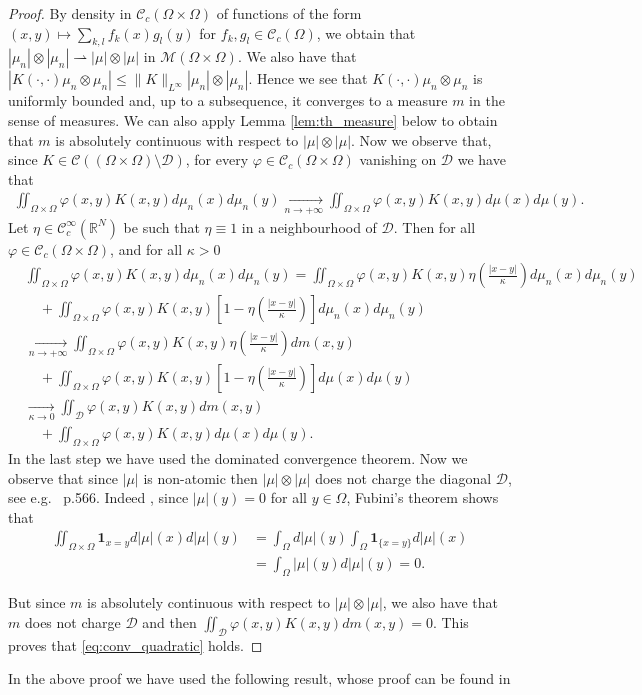 \documentclass[12pt,reqno]{amsart}
\def\C{{\mathcal C}}
\def\D{{\mathcal D}}
\def \O{{\Omega}}
\def\M{{\mathcal M}}
\newcommand{\R}{\mathbb{R}}
\numberwithin{equation}{section}
\begin{document}
\begin{proof}
By density  in \(\C_c(\Omega\times \Omega)\) of functions of the form \((x,y)\mapsto \sum_{k,l} f_k(x)g_l(y)\) for \(f_k,g_l\in \C_c(\Omega)\), we obtain that \(|\mu_n| \otimes |\mu_n| \rightharpoonup |\mu| \otimes |\mu|\) in \(\M(\Omega\times \Omega)\).  We also have that 
\( \left| K(\cdot,\cdot)\mu_n\otimes \mu_n\right| \leq \|K\|_{L^\infty}|\mu_n| \otimes |\mu_n|\). Hence we see that \(K(\cdot,\cdot)\mu_n\otimes \mu_n\) is uniformly bounded and, up to a subsequence, it converges to a measure \(m\) in the sense of measures. We can also apply Lemma \ref{lem:th_measure} below to obtain that \(m\) is absolutely continuous with respect to \(|\mu|\otimes |\mu|\).
Now we observe that, since \(K \in \C((\Omega \times \Omega) \setminus \D)\), for every \(\varphi\in \C_c(\Omega \times \Omega)\) vanishing on \(\D\) we have that
\begin{align*}
\iint_{\O\times \O}\varphi(x,y) K(x,y)d\mu_n(x)d\mu_n(y) \xrightarrow[n \to +\infty]{} \iint_{\O\times \O}\varphi(x,y) K(x,y)d\mu(x)d\mu(y).
\end{align*}
Let \(\eta \in \C^\infty_c(\R^N)\) be such that \(\eta \equiv 1\) in a neighbourhood of \(\D\). Then for all \(\varphi \in \C_c(\Omega \times \Omega)\), and for all \(\kappa>0\)
\begin{align*}
&\iint_{\O\times \O}\varphi(x,y) K(x,y)d\mu_n(x)d\mu_n(y) = \iint_{\O\times \O}\varphi(x,y) K(x,y)\eta\left(\frac{|x-y|}{\kappa}\right)d\mu_n(x)d\mu_n(y) \\
&  \quad + \iint_{\O\times \O}\varphi(x,y) K(x,y)\left[1-\eta\left(\frac{|x-y|}{\kappa}\right)\right] d\mu_n(x)d\mu_n(y) \\
& \xrightarrow[n\to +\infty]{}\iint_{\O\times \O}\varphi(x,y) K(x,y)\eta\left(\frac{|x-y|}{\kappa}\right)dm(x,y) \\
 &\quad + \iint_{\O\times \O}\varphi(x,y) K(x,y)\left[1-\eta\left(\frac{|x-y|}{\kappa}\right)\right] d\mu(x)d\mu(y)  \\
& \xrightarrow[\kappa \to 0]{}\iint_{\D}\varphi(x,y) K(x,y)dm(x,y) \\
& \quad + \iint_{\O\times \O}\varphi(x,y) K(x,y) d\mu(x)d\mu(y).
\end{align*}
In the last step we have used the dominated convergence theorem. Now we observe that since \(|\mu|\) is non-atomic then \(|\mu|\otimes |\mu|\) does not charge the diagonal \(\D\), see e.g.\ \cite{Delort_1991} p.566. Indeed , since \(|\mu|(y)=0\) for all \(y \in \Omega\), Fubini's theorem shows that 
\begin{align*}
\iint_{\Omega \times \Omega} \textbf{1}_{x=y} d|\mu|(x)d|\mu|(y) &= \int_{\Omega} d|\mu|(y)\int_{\Omega}\textbf{1}_{\{x=y\}} d |\mu|(x) \\
&=\int_{\Omega}|\mu|(y) d|\mu|(y)=0.
\end{align*}

But since \(m\) is absolutely continuous with respect to \(|\mu|\otimes |\mu|\), we also have that \(m\) does not charge \(\D\) and then
\(\iint_{\D}\varphi(x,y) K(x,y)dm(x,y)=0\). This proves that \eqref{eq:conv_quadratic} holds.
\end{proof}
In the above proof we have used the following result, whose proof can be found in \cite[Lemma 5.1]{Schochet_1995}
\end{document}

